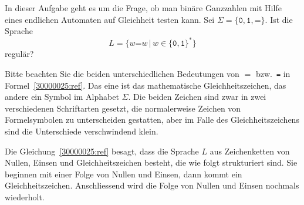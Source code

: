 In dieser Aufgabe geht es um die Frage, ob man binäre Ganzzahlen mit
Hilfe eines endlichen Automaten auf Gleichheit testen kann.
Sei $\Sigma=\{\texttt{0},\texttt{1},\texttt{=}\}$. Ist die Sprache
\begin{equation}
L=\{ w\texttt{=}w\,|\,w\in \{\texttt{0},\texttt{1}\}^*\}
\label{30000025:ref}
\end{equation}
regulär?


\begin{hinweis}
Bitte beachten Sie die beiden unterschiedlichen Bedeutungen von $=$
bzw.~\texttt{=} in Formel~\eqref{30000025:ref}.
Das eine ist das mathematische Gleichheitszeichen, das andere ein Symbol
im Alphabet $\Sigma$.
Die beiden Zeichen sind zwar in zwei verschiedenen Schriftarten gesetzt,
die normalerweise Zeichen von Formelsymbolen zu unterscheiden gestatten,
aber im Falle des Gleichheitszeichens sind die Unterschiede verschwindend
klein.

Die Gleichung~\eqref{30000025:ref} besagt, dass die Sprache $L$ aus
Zeichenketten von Nullen, Einsen und Gleichheitszeichen besteht, die
wie folgt strukturiert sind.
Sie beginnen mit einer Folge von Nullen und Einsen, dann kommt ein
Gleichheitszeichen.
Anschliessend wird die Folge von Nullen und Einsen nochmals wiederholt.
\end{hinweis}


